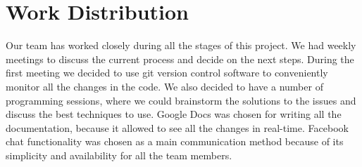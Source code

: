 \documentclass[parskip=full]{aaltoseries}
\begin{document}
\chapter{Work Distribution}
Our team has worked closely during all the stages of this project. We had weekly meetings to discuss the current process and decide on the next steps. During the first meeting we decided to use git version control software to conveniently monitor all the changes in the code. We also decided to have a number of programming sessions, where we could brainstorm the solutions to the issues and discuss the best techniques to use. Google Docs was chosen for writing all the documentation, because it allowed to see all the changes in real-time. Facebook chat functionality was chosen as a main communication method because of its simplicity and availability for all the team members.
\end{document}
